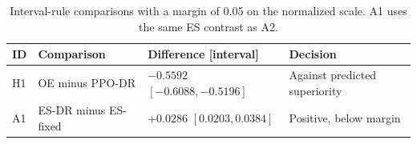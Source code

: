 \begin{table}[tb]
\centering\small
\caption{Interval-rule comparisons with a margin of 0.05 on the normalized scale. A1 uses the same ES contrast as A2.}\label{tab:primaryrules}
\begin{tabularx}{\linewidth}{lYYY}
\toprule
ID & Comparison & Difference [interval] & Decision\\\midrule
H1 & OE minus PPO-DR & $-0.5592$ $[-0.6088,-0.5196]$ & Against predicted superiority\\
A1 & ES-DR minus ES-fixed & $+0.0286$ $[0.0203,0.0384]$ & Positive, below margin\\
\bottomrule
\end{tabularx}
\end{table}
